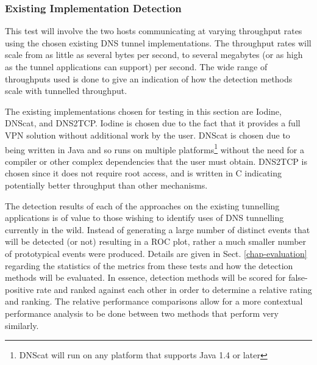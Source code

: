 \documentclass{llncs}
\begin{document}
\subsubsection{Existing Implementation Detection}
\label{test-existing}
This test will involve the two hosts communicating at varying throughput rates
using the chosen existing DNS tunnel implementations. The throughput rates will scale
from as little as several bytes per second, to several megabytes (or as high as
the tunnel applications can support) per second. The wide range of throughputs
used is done to give an indication of how the detection methods scale with
tunnelled throughput.

The existing implementations chosen for testing in this section are
Iodine\cite{iodinesrc}, DNScat\cite{dnscatsrc}, and DNS2TCP\cite{dns2tcpsrc}.
Iodine is chosen due to the fact that it provides a full VPN solution without
additional work by the user. DNScat is chosen due to being written in Java and
so runs on multiple platforms\footnote{DNScat will run on any platform that
supports Java 1.4 or later\cite{dnscatsrc}} without the need for a compiler or
other complex dependencies that the user must obtain. DNS2TCP is chosen since it
does not require root access, and is written in C indicating potentially better
throughput than other mechanisms.

The detection results of each of the approaches on the existing tunnelling
applications is of value to those wishing to identify uses of DNS tunnelling
currently in the wild. Instead of generating a large number of distinct events
that will be detected (or not) resulting in a ROC plot, rather a much smaller
number of prototypical events were produced. Details are given in Sect.
\ref{chap-evaluation} regarding the statistics of the metrics from these tests
and how the detection methods will be evaluated. In essence, detection methods
will be scored for false-positive rate and ranked against each other in order to
determine a relative rating and ranking. The relative performance comparisons
allow for a more contextual performance analysis to be done between two methods
that perform very similarly.
\end{document}

